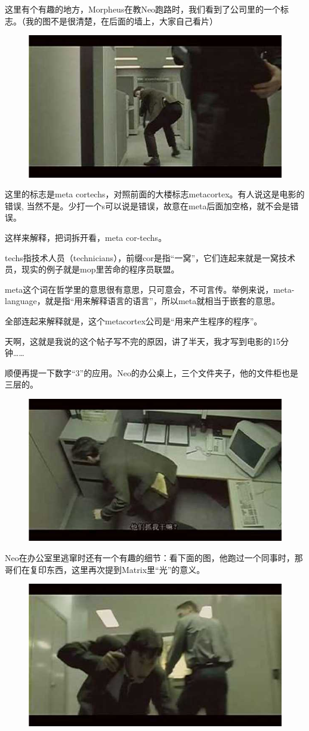 \documentclass[UTF8]{ctexart}
\begin{document}
这里有个有趣的地方，Morpheus在教Neo跑路时，我们看到了公司里的一个标志。（我的图不是很清楚，在后面的墙上，大家自己看片）

\begin{figure}[htb]
\centering
\includegraphics[width=0.5\linewidth]{fig/read_Matrix-9}
\end{figure}

这里的标志是meta cortechs，对照前面的大楼标志metacortex。有人说这是电影的错误, 当然不是。少打一个s可以说是错误，故意在meta后面加空格，就不会是错误。

这样来解释，把词拆开看，meta cor-techs。

techs指技术人员（technicians），前缀cor是指“一窝”，它们连起来就是一窝技术员，现实的例子就是mop里苦命的程序员联盟。

meta这个词在哲学里的意思很有意思，只可意会，不可言传。举例来说，meta-language，就是指“用来解释语言的语言”，所以meta就相当于嵌套的意思。

全部连起来解释就是，这个metacortex公司是“用来产生程序的程序”。

天啊，这就是我说的这个帖子写不完的原因，讲了半天，我才写到电影的15分钟……

顺便再提一下数字“3”的应用。Neo的办公桌上，三个文件夹子，他的文件柜也是三层的。

\begin{figure}[htb]
\centering
\includegraphics[width=0.5\linewidth]{fig/read_Matrix-10}
\end{figure}

Neo在办公室里逃窜时还有一个有趣的细节：看下面的图，他跑过一个同事时，那哥们在复印东西，这里再次提到Matrix里“光”的意义。

\begin{figure}[htb]
\centering
\includegraphics[width=0.5\linewidth]{fig/read_Matrix-11}
\end{figure}
\end{document}
